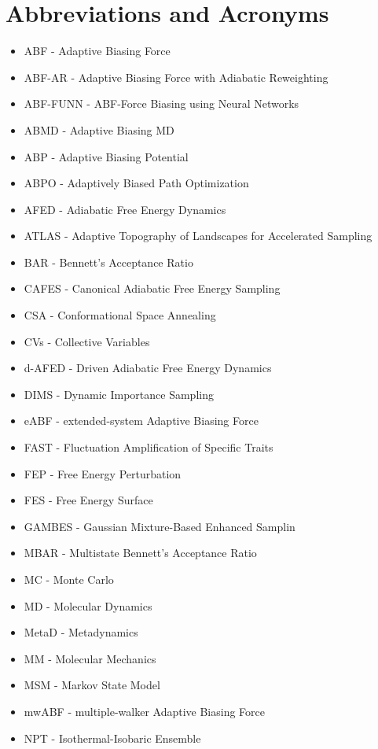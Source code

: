 \documentclass[9pt,review]{livecoms}
\begin{document}
\section{Abbreviations and Acronyms}
\begin{itemize}
    \item ABF - Adaptive Biasing Force
    \item ABF-AR - Adaptive Biasing Force with Adiabatic Reweighting
    \item ABF-FUNN - ABF-Force Biasing using Neural Networks
    \item ABMD - Adaptive Biasing MD
    \item ABP - Adaptive Biasing Potential
    \item ABPO - Adaptively Biased Path Optimization
    \item AFED - Adiabatic Free Energy Dynamics
    \item ATLAS - Adaptive Topography of Landscapes for Accelerated Sampling
    \item BAR - Bennett’s Acceptance Ratio
    \item CAFES - Canonical Adiabatic Free Energy Sampling
    \item CSA - Conformational Space Annealing
    \item CVs - Collective Variables
    \item d-AFED - Driven Adiabatic Free Energy Dynamics
    \item DIMS - Dynamic Importance Sampling
    \item eABF - extended-system Adaptive Biasing Force
    \item FAST - Fluctuation Amplification of Specific Traits
    \item FEP - Free Energy Perturbation
    \item FES - Free Energy Surface
    \item GAMBES - Gaussian Mixture-Based Enhanced Samplin
    \item MBAR - Multistate Bennett’s Acceptance Ratio
    \item MC - Monte Carlo
    \item MD - Molecular Dynamics
    \item MetaD - Metadynamics
    \item MM - Molecular Mechanics
    \item MSM - Markov State Model
    \item mwABF - multiple-walker Adaptive Biasing Force
    \item NPT - Isothermal-Isobaric Ensemble

\end{itemize}
\end{document}
